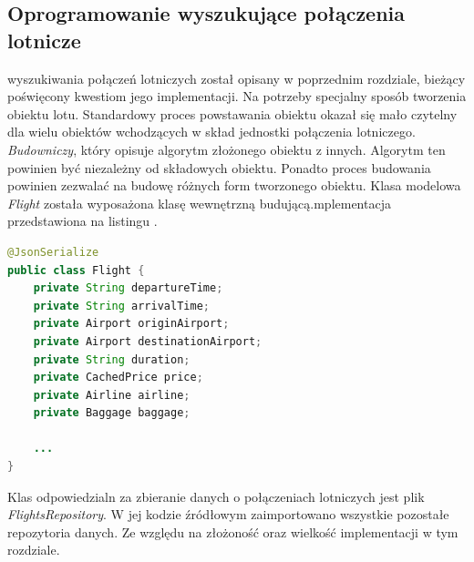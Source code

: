 \documentclass[12pt, twoside]{report}
\begin{document}
\subsection{Oprogramowanie wyszukujące połączenia lotnicze}
 wyszukiwania połączeń lotniczych został  opisany w poprzednim rozdziale, bieżący  poświęcony kwestiom jego implementacji. Na potrzeby  specjalny sposób tworzenia obiektu lotu. Standardowy proces powstawania obiektu  okazał się mało czytelny  dla wielu obiektów wchodzących w skład jednostki połączenia lotniczego.  \textit{Budowniczy}, który opisuje algorytm  złożonego obiektu z innych. Algorytm ten powinien być niezależny od składowych obiektu. Ponadto proces budowania powinien zezwalać na budowę różnych form tworzonego obiektu.\cite{builder}
Klasa modelowa \textit{Flight} została wyposażona klasę wewnętrzną  budującą.mplementacja   przedstawiona na listingu .
\begin{lstlisting}[language=java, caption=Fragment klasy Flight, label=lst:attributes]
@JsonSerialize
public class Flight {
    private String departureTime;
    private String arrivalTime;
    private Airport originAirport;
    private Airport destinationAirport;
    private String duration;
    private CachedPrice price;
    private Airline airline;
    private Baggage baggage;
    
    ...
}
\end{lstlisting}
Klas odpowiedzialn za zbieranie danych o połączeniach lotniczych jest plik \textit{FlightsRepository}. W jej kodzie źródłowym zaimportowano wszystkie pozostałe repozytoria danych. 
  Ze względu na złożoność oraz wielkość 
implementacji  w tym rozdziale.
\end{document}
